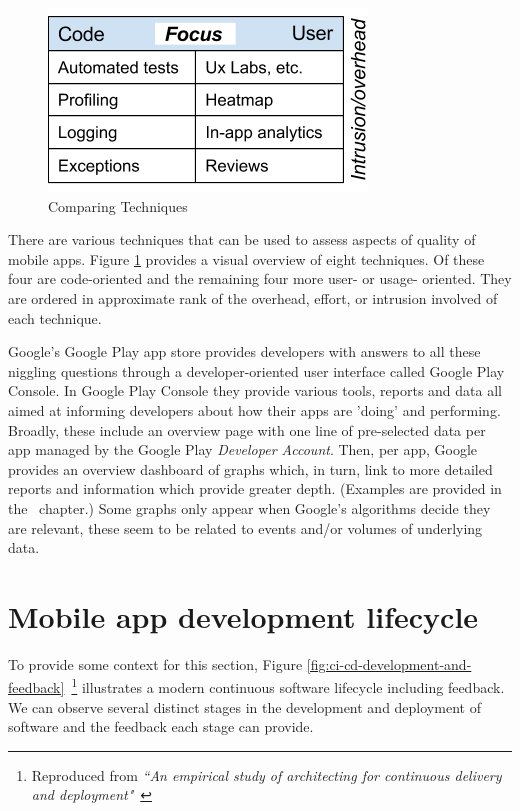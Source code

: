 \begin{figure}[ht]
    \centering
    \includegraphics{images/ComparingTechniquesRHS.png}
    \caption{Comparing Techniques}
    \label{fig:comparing_techniques}
\end{figure}

There are various techniques that can be used to assess aspects of quality of mobile apps. Figure \ref{fig:comparing_techniques} provides a visual overview of eight techniques. Of these four are code-oriented and the remaining four more user- or usage- oriented. They are ordered in approximate rank of the overhead, effort, or intrusion involved of each technique. %

Google's Google Play app store provides developers with answers to all these niggling questions through a developer-oriented user interface called Google Play Console. 
In Google Play Console they provide various tools, reports and data all aimed at informing developers about how their apps are 'doing' and performing. Broadly, these include an overview page with one line of pre-selected data per app managed by the Google Play \textit{Developer Account}. Then, per app, Google provides an overview dashboard of graphs which, in turn, link to more detailed reports and information which provide greater depth. (Examples are provided in the~\href{chapter-analytics-tools}{\emph{}} chapter.)  Some graphs only appear when Google's algorithms decide they are relevant, these seem to be related to events and/or volumes of underlying data.

\section{Mobile app development lifecycle}
To provide some context for this section, Figure \ref{fig:ci-cd-development-and-feedback}~\footnote{Reproduced from \emph{``An empirical study of architecting for continuous delivery and deployment"}~\cite{shahin2019empirical_study_architecting_cd}}
illustrates a modern continuous software lifecycle including feedback. We can observe several distinct stages in the development and deployment of software and the feedback each stage can provide. %

